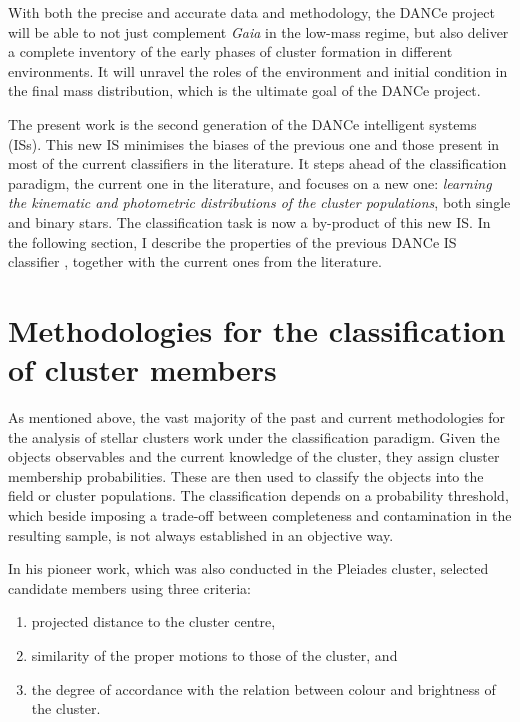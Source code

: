 With both the precise and accurate data and methodology, the DANCe project will be able to not just complement \emph{Gaia} in the low-mass regime, but also deliver a complete inventory of the early phases of cluster formation in different environments. It will unravel the roles of the environment and initial condition in the final mass distribution, which is the ultimate goal of the DANCe project.

The present work is the second generation of the DANCe intelligent systems (ISs). This new IS minimises the biases of the previous one and those present in most of the current classifiers in the literature. It steps ahead of the classification paradigm, the current one in the literature, and focuses on a new one: \textit{learning the kinematic and photometric distributions of the cluster populations}, both single and binary stars. The classification task is now a by-product of this new IS. In the following section, I describe the properties of the previous DANCe IS classifier \cite[the one from][]{Sarro2014}, together with the current ones from the literature.    

\section{Methodologies for the classification of cluster members}
\label{sect:current_methodologies}

As mentioned above, the vast majority of the past and current methodologies for the analysis of stellar clusters work under the classification paradigm. Given the objects observables and the current knowledge of the cluster, they assign cluster membership probabilities. These are then used to classify the objects into the field or cluster populations. The classification depends on a probability threshold, which beside imposing a trade-off between completeness and contamination in the resulting sample, is not always established in an objective way.  

In his pioneer work, which was also conducted in the Pleiades cluster, \citet{Trumpler1921} selected candidate members using three criteria: 
\begin{enumerate}
\item projected distance to the cluster centre,
\item similarity of the proper motions to those of the cluster, and
\item the degree of accordance with the relation between colour and brightness of the cluster. 
\end{enumerate}

